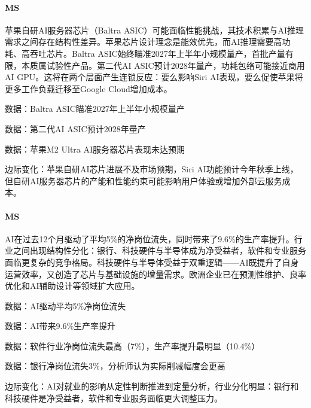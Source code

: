 \documentclass[11pt]{ctexart}
\begin{document}
\paragraph{MS} 苹果自研AI服务器芯片（Baltra ASIC）可能面临性能挑战，其技术积累与AI推理需求之间存在结构性差异。苹果芯片设计理念是能效优先，而AI推理需要高功耗、高吞吐芯片。Baltra ASIC始终瞄准2027年上半年小规模量产，首批产量有限，本质属试验性产品。第二代AI ASIC预计2028年量产，功耗包络可能接近商用AI GPU。这将在两个层面产生连锁反应：要么影响Siri AI表现，要么促使苹果将更多工作负载迁移至Google Cloud增加成本。
{\small\color{refgray}数据：Baltra ASIC瞄准2027年上半年小规模量产\par}
{\small\color{refgray}数据：第二代AI ASIC预计2028年量产\par}
{\small\color{refgray}数据：苹果M2 Ultra AI服务器芯片表现未达预期\par}
{\small\color{refgray}边际变化：苹果自研AI芯片进展不及市场预期，Siri AI功能预计今年秋季上线，但自研AI服务器芯片的产能和性能约束可能影响用户体验或增加外部云服务成本。\par}
\paragraph{MS} AI在过去12个月驱动了平均5\%的净岗位流失，同时带来了9.6\%的生产率提升。行业之间出现结构性分化：银行、科技硬件与半导体成为净受益者，软件和专业服务面临更复杂的竞争格局。科技硬件与半导体受益于双重逻辑——AI既提升了自身运营效率，又创造了芯片与基础设施的增量需求。欧洲企业已在预测性维护、良率优化和AI辅助设计等领域扩大应用。
{\small\color{refgray}数据：AI驱动平均5\%净岗位流失\par}
{\small\color{refgray}数据：AI带来9.6\%生产率提升\par}
{\small\color{refgray}数据：软件行业净岗位流失最高（7\%），生产率提升最明显（10.4\%）\par}
{\small\color{refgray}数据：银行净岗位流失3\%，分析师认为实际削减幅度会更高\par}
{\small\color{refgray}边际变化：AI对就业的影响从定性判断推进到定量分析，行业分化明显：银行和科技硬件是净受益者，软件和专业服务面临更大调整压力。\par}
\end{document}
